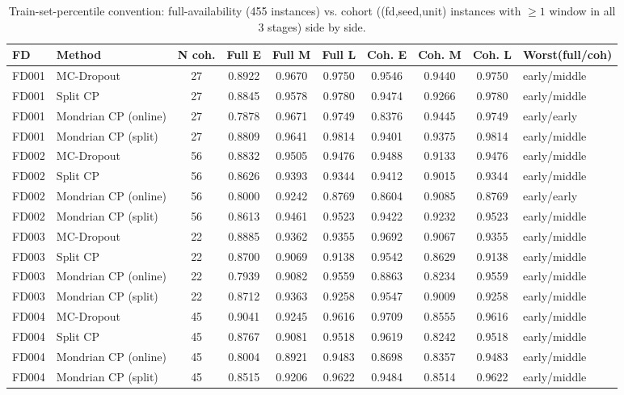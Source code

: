 \begin{table}[t]
\caption{Train-set-percentile convention: full-availability (455 instances) vs. cohort ((fd,seed,unit) instances with $\geq 1$ window in all 3 stages) side by side.}
\label{tab:trainpct-full-vs-cohort}
\centering
\small
\begin{tabular}{llccccccc}
\toprule
FD & Method & N coh. & Full E & Full M & Full L & Coh. E & Coh. M & Coh. L & Worst(full/coh) \\
\midrule
FD001 & MC-Dropout & 27 & 0.8922 & 0.9670 & 0.9750 & 0.9546 & 0.9440 & 0.9750 & early/middle \\
FD001 & Split CP & 27 & 0.8845 & 0.9578 & 0.9780 & 0.9474 & 0.9266 & 0.9780 & early/middle \\
FD001 & Mondrian CP (online) & 27 & 0.7878 & 0.9671 & 0.9749 & 0.8376 & 0.9445 & 0.9749 & early/early \\
FD001 & Mondrian CP (split) & 27 & 0.8809 & 0.9641 & 0.9814 & 0.9401 & 0.9375 & 0.9814 & early/middle \\
FD002 & MC-Dropout & 56 & 0.8832 & 0.9505 & 0.9476 & 0.9488 & 0.9133 & 0.9476 & early/middle \\
FD002 & Split CP & 56 & 0.8626 & 0.9393 & 0.9344 & 0.9412 & 0.9015 & 0.9344 & early/middle \\
FD002 & Mondrian CP (online) & 56 & 0.8000 & 0.9242 & 0.8769 & 0.8604 & 0.9085 & 0.8769 & early/early \\
FD002 & Mondrian CP (split) & 56 & 0.8613 & 0.9461 & 0.9523 & 0.9422 & 0.9232 & 0.9523 & early/middle \\
FD003 & MC-Dropout & 22 & 0.8885 & 0.9362 & 0.9355 & 0.9692 & 0.9067 & 0.9355 & early/middle \\
FD003 & Split CP & 22 & 0.8700 & 0.9069 & 0.9138 & 0.9542 & 0.8629 & 0.9138 & early/middle \\
FD003 & Mondrian CP (online) & 22 & 0.7939 & 0.9082 & 0.9559 & 0.8863 & 0.8234 & 0.9559 & early/middle \\
FD003 & Mondrian CP (split) & 22 & 0.8712 & 0.9363 & 0.9258 & 0.9547 & 0.9009 & 0.9258 & early/middle \\
FD004 & MC-Dropout & 45 & 0.9041 & 0.9245 & 0.9616 & 0.9709 & 0.8555 & 0.9616 & early/middle \\
FD004 & Split CP & 45 & 0.8767 & 0.9081 & 0.9518 & 0.9619 & 0.8242 & 0.9518 & early/middle \\
FD004 & Mondrian CP (online) & 45 & 0.8004 & 0.8921 & 0.9483 & 0.8698 & 0.8357 & 0.9483 & early/middle \\
FD004 & Mondrian CP (split) & 45 & 0.8515 & 0.9206 & 0.9622 & 0.9484 & 0.8514 & 0.9622 & early/middle \\
\bottomrule
\end{tabular}
\end{table}
